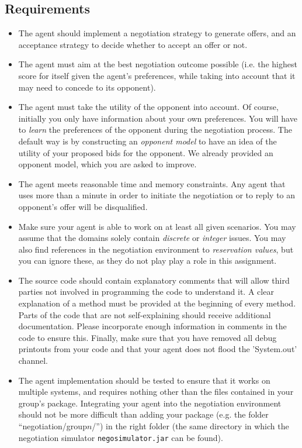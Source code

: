 \documentclass[a4paper]{article}
\begin{document}
\subsection{Requirements}
\begin{itemize}
\item The agent should implement a negotiation strategy to generate offers, and an acceptance strategy to decide whether to accept an offer or not.
\item The agent must aim at the best negotiation outcome possible (i.e. the highest score for itself given the agent's preferences, while taking into account that it may need to concede to its opponent).
\item The agent must take the utility of the opponent into account. Of course, initially you only have information about your own preferences. You will have to \emph{learn} the preferences of the opponent during the negotiation process. The default way is by constructing an \emph{opponent model} to have an idea of the utility of your proposed bids for the opponent. We already provided an opponent model, which you are asked to improve.
\item The agent meets reasonable time and memory constraints. Any agent that uses more than a minute in order to initiate the negotiation or to reply to an opponent's offer will be disqualified.
\item Make sure your agent is able to work on at least all given scenarios. You may assume that the domains solely contain \emph{discrete} or \emph{integer} issues. You may also find references in the negotiation environment to \emph{reservation values}, but you can ignore these, as they do not play play a role in this assignment.
\item The source code should contain explanatory comments that will allow third parties not involved in programming the code to understand it. A clear explanation of a method must be provided at the beginning of every method. Parts of the code that are not self-explaining should receive additional documentation. Please incorporate enough information in comments in the code to ensure this. Finally, make sure that you have removed all debug printouts from your code and that your agent does not flood the 'System.out' channel.
\item The agent implementation should be tested to ensure that it works on multiple systems, and requires nothing other than the files contained in your group's package. Integrating your agent into the negotiation environment should not be more difficult than adding your package (e.g. the folder ``negotiation/group$n$/'') in the right folder (the same directory in which the negotiation simulator \verb|negosimulator.jar| can be found).

\end{itemize}
\end{document}
